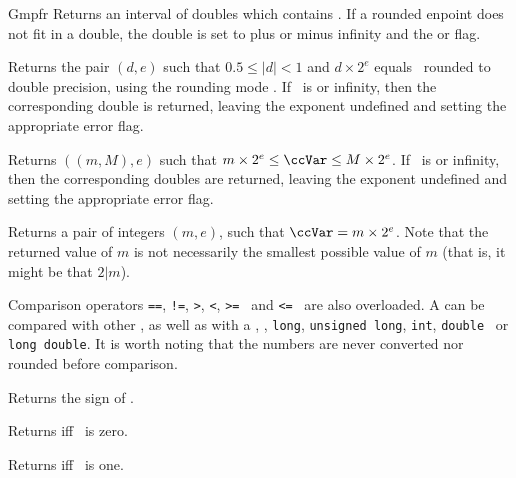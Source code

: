 \begin{ccRefClass} {Gmpfr}
        {Returns an interval of doubles which contains \ccVar. If a
        rounded enpoint does not fit in a double, the double is set to plus
        or minus infinity and the  or  flag.}

        {Returns the pair \( (d,e) \) such that \( 0.5 \le |d| < 1 \) and
        \( d \times 2^e \) equals \ccVar~rounded to double precision,
        using the rounding mode . If \ccVar~is  or
        infinity, then the corresponding double is returned, leaving
        the exponent undefined and setting the appropriate error flag.}

        {Returns \( ((m,M),e) \) such that \( m \times 2^e \le \ccVar
        \le M \times 2^e \). If \ccVar~is  or infinity, then
        the corresponding doubles are returned, leaving the exponent
        undefined and setting the appropriate error flag.}

        {Returns a pair of integers \( (m,e) \), such that
        \( \ccVar = m \times 2^e \). Note that the returned value of \(m\)
        is not necessarily the smallest possible value of \(m\) (that is,
        it might be that \(2|m\)).}



Comparison operators \verb-==-, \verb-!=-, \verb->-, \verb-<-, \verb->=-
\ and \verb-<=- \ are also overloaded. A  can be compared
with other , as well as with a , ,
\verb=long=, \verb=unsigned long=, \verb=int=, \verb=double= \ or
\verb=long double=. It is worth noting that the numbers are never
converted nor rounded before comparison.


\ccQueryFunctions

        {Returns the sign of \ccVar.}

        {Returns  iff \ccVar~is zero.}

        {Returns  iff \ccVar~is one.}


\end{ccRefClass}
